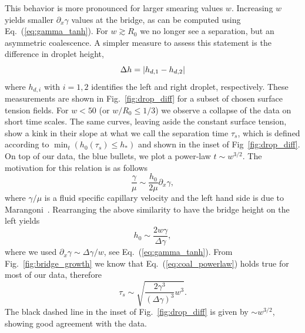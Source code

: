 \documentclass[twocolumn,amsmath,amssymb,showpacs,nofootinbib,prfluids,superscriptaddress]{revtex4-2} %
\begin{document}
This behavior is more pronounced for larger smearing values $w$.
Increasing $w$ yields smaller $\partial_x\gamma$ values at the bridge, as can be computed using Eq.~(\ref{eq:gamma_tanh}). 
For $w\gtrsim R_0$ we no longer see a separation, but an asymmetric coalescence.
A simpler measure to assess this statement is the difference in droplet height,
\begin{equation}\label{eq:drop_diff_h}
    \Delta h = \abs{h_{d,1} - h_{d,2}}
\end{equation}
where $h_{d,i}$ with $i=1,2$ identifies the left and right droplet, respectively.
These measurements are shown in Fig.~\ref{fig:drop_diff} for a subset of chosen surface tension fields.
For $w < 50$ (or $w/R_0 \le 1/3$) we observe a collapse of the data on short time scales.
The same curves, leaving aside the constant surface tension, show a kink in their slope at what we call the separation time $\tau_s$, which is defined according to $\min_t(h_0(\tau_{s}) \le h_{\ast})$ and shown in the inset of Fig~\ref{fig:drop_diff}.
On top of our data, the blue bullets, we plot a power-law $t \sim w^{3/2}$.
The motivation for this relation is as follows
\begin{equation}\label{eq:velsim1}
    \frac{\gamma}{\mu} \sim \frac{h_0}{2\mu}\partial_x\gamma,
\end{equation}
where $\gamma/\mu$ is a fluid specific capillary velocity and the left hand side is due to Marangoni~\cite{PhysRevLett.95.164503, doi:10.1021/la971292t}.
Rearranging the above similarity to have the bridge height on the left yields
\begin{equation}\label{velsim2}
    h_0 \sim \frac{2w\gamma}{\Delta\gamma},
\end{equation}
where we used $\partial_x\gamma \sim \Delta\gamma/w$, see Eq.~(\ref{eq:gamma_tanh}).
From Fig.~\ref{fig:bridge_growth} we know that Eq.~(\ref{eq:coal_powerlaw}) holds true for most of our data, therefore
\begin{equation}\label{velsim3}
    \tau_s \sim \sqrt{\frac{2\gamma^3}{(\Delta\gamma)^3}w^3}.
\end{equation}
The black dashed line in the inset of Fig.~\ref{fig:drop_diff} is given by $\sim w^{3/2}$, showing good agreement with the data.
\end{document}
